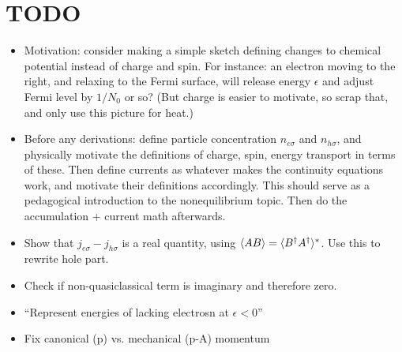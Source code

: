 \section{TODO}
\begin{itemize}
  \item
    Motivation: consider making a simple sketch defining changes to chemical potential instead of charge and spin.
    For instance: an electron moving to the right, and relaxing to the Fermi surface, will release energy $\epsilon$ and adjust Fermi level by $1/N_0$ or so?
    (But charge is easier to motivate, so scrap that, and only use this picture for heat.)
  \item
    Before any derivations: define particle concentration $n_{e\sigma}$ and $n_{h\sigma}$, and physically motivate the definitions of charge, spin, energy transport in terms of these.
    Then define currents as whatever makes the continuity equations work, and motivate their definitions accordingly.
    This should serve as a pedagogical introduction to the nonequilibrium topic.
    Then do the accumulation + current math afterwards.
  \item 
    Show that $j_{e\sigma} - j_{h\sigma}$ is a real quantity, using $\langle AB \rangle = \langle B^{\dagger} A^{\dagger} \rangle^{\ast}$.
    Use this to rewrite hole part.
  \item 
    Check if non-quasiclassical term is imaginary and therefore zero.
  \item
    ``Represent energies of lacking electrosn at $\epsilon<0$''
  \item 
    Fix canonical (p) vs. mechanical (p-A) momentum
\end{itemize}


